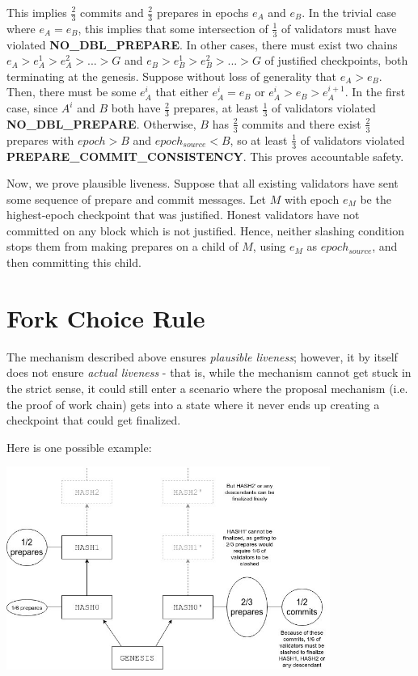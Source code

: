 \documentclass[12pt]{article}
\begin{document}
This implies $\frac{2}{3}$ commits and $\frac{2}{3}$ prepares in epochs $e_A$ and $e_B$. In the trivial case where $e_A = e_B$, this implies that some intersection of $\frac{1}{3}$ of validators must have violated \textbf{NO\_DBL\_PREPARE}. In other cases, there must exist two chains $e_A > e_A^1 > e_A^2 > ... > G$ and $e_B > e_B^1 > e_B^2 > ... > G$ of justified checkpoints, both terminating at the genesis. Suppose without loss of generality that $e_A > e_B$. Then, there must be some $e_A^i$ that either $e_A^i = e_B$ or $e_A^i > e_B > e_A^{i+1}$. In the first case, since $A^i$ and $B$ both have $\frac{2}{3}$ prepares, at least $\frac{1}{3}$ of validators violated \textbf{NO\_DBL\_PREPARE}. Otherwise, $B$ has $\frac{2}{3}$ commits and there exist $\frac{2}{3}$ prepares with $epoch > B$ and $epoch_{source} < B$, so at least $\frac{1}{3}$ of validators violated \textbf{PREPARE\_COMMIT\_CONSISTENCY}. This proves accountable safety.

Now, we prove plausible liveness. Suppose that all existing validators have sent some sequence of prepare and commit messages. Let $M$ with epoch $e_M$ be the highest-epoch checkpoint that was justified. Honest validators have not committed on any block which is not justified. Hence, neither slashing condition stops them from making prepares on a child of $M$, using $e_M$ as $epoch_{source}$, and then committing this child.

\section{Fork Choice Rule}

The mechanism described above ensures \textit{plausible liveness}; however, it by itself does not ensure \textit{actual liveness} - that is, while the mechanism cannot get stuck in the strict sense, it could still enter a scenario where the proposal mechanism (i.e. the proof of work chain) gets into a state where it never ends up creating a checkpoint that could get finalized.

Here is one possible example:

\includegraphics[width=400px]{fork_choice_rule.jpeg}
\end{document}
